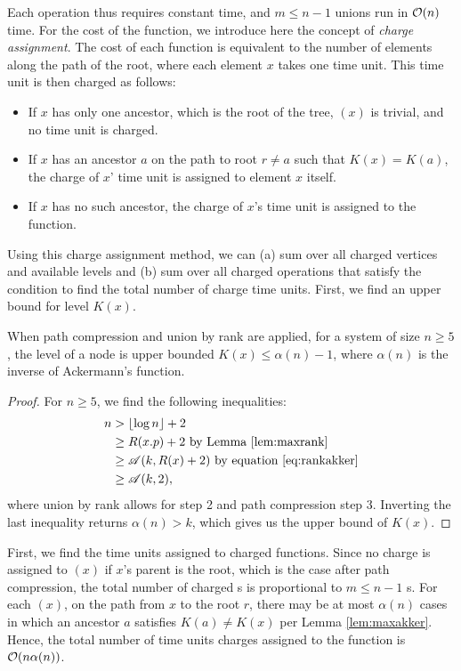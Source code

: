 Each  operation thus requires constant time, and $m\leq n-1$ unions run in $\mathcal{O}(n)$ time. For the cost of the  function, we introduce here the concept of \emph{charge assignment}. The cost of each  function is equivalent to the number of elements along the path of the root, where each element $x$ takes one time unit. This time unit is then charged as follows:
\begin{itemize}
  \item If $x$ has only one ancestor, which is the root of the tree, $(x)$ is trivial, and no time unit is charged. 
  \item If $x$ has an ancestor $a$ on the path to root $r\neq a$ such that $K(x)=K(a)$, the charge of $x$' time unit is assigned to element $x$ itself.
  \item If $x$ has no such ancestor, the charge of $x$'s time unit is assigned to the  function.
\end{itemize}
Using this charge assignment method, we can (a) sum over all charged vertices and available levels and (b) sum over all charged  operations that satisfy the condition to find the total number of charge time units. First, we find an upper bound for level $K(x)$. 

\begin{lemma}\label{lem:maxakker}
  When path compression and union by rank are applied, for a system of size $n\geq 5$, the level of a node is upper bounded $K(x) \leq \alpha(n) -1$, where $\alpha(n)$ is the inverse of Ackermann's function. 
\end{lemma}
\begin{proof}
  For $n\geq 5$, we find the following inequalities:
  \begin{align*}
    n &> \lfloor \log n \rfloor + 2 \\
    &\geq R(x.p) + 2 \text{ by Lemma \ref{lem:maxrank}}\\
    &\geq \mathscr{A}(k,R(x)+2) \text{ by equation \eqref{eq:rankakker}}\\
    &\geq \mathscr{A}(k,2),
  \end{align*}
  where union by rank allows for step 2 and path compression step 3. Inverting the last inequality returns $\alpha(n) > k$, which gives us the upper bound of $K(x)$. 
\end{proof}

First, we find the time units assigned to charged  functions. Since no charge is assigned to $(x)$ if $x$'s parent is the root, which is the case after path compression, the total number of charged s is proportional to $m\leq n-1$ s. For each $(x)$, on the path from $x$ to the root $r$, there may be at most $\alpha(n)$ cases in which an ancestor $a$ satisfies $K(a)\neq K(x)$ per Lemma \ref{lem:maxakker}. Hence, the total number of time units charges assigned to the  function is $\mathcal{O}(n\alpha(n))$. 


